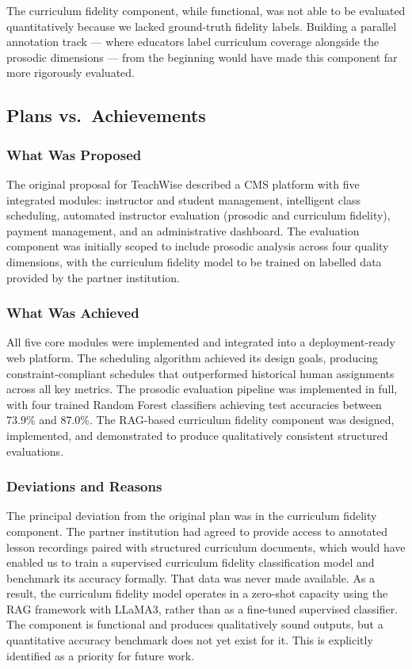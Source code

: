 The curriculum fidelity component, while functional, was not able to be evaluated quantitatively because we lacked ground-truth fidelity labels. Building a parallel annotation track --- where educators label curriculum coverage alongside the prosodic dimensions --- from the beginning would have made this component far more rigorously evaluated.

\subsection{Plans vs.\ Achievements}

\subsubsection{What Was Proposed}

The original proposal for TeachWise described a CMS platform with five integrated modules: instructor and student management, intelligent class scheduling, automated instructor evaluation (prosodic and curriculum fidelity), payment management, and an administrative dashboard. The evaluation component was initially scoped to include prosodic analysis across four quality dimensions, with the curriculum fidelity model to be trained on labelled data provided by the partner institution.

\subsubsection{What Was Achieved}

All five core modules were implemented and integrated into a deployment-ready web platform. The scheduling algorithm achieved its design goals, producing constraint-compliant schedules that outperformed historical human assignments across all key metrics. The prosodic evaluation pipeline was implemented in full, with four trained Random Forest classifiers achieving test accuracies between 73.9\% and 87.0\%. The RAG-based curriculum fidelity component was designed, implemented, and demonstrated to produce qualitatively consistent structured evaluations.

\subsubsection{Deviations and Reasons}

The principal deviation from the original plan was in the curriculum fidelity component. The partner institution had agreed to provide access to annotated lesson recordings paired with structured curriculum documents, which would have enabled us to train a supervised curriculum fidelity classification model and benchmark its accuracy formally. That data was never made available. As a result, the curriculum fidelity model operates in a zero-shot capacity using the RAG framework with LLaMA3, rather than as a fine-tuned supervised classifier. The component is functional and produces qualitatively sound outputs, but a quantitative accuracy benchmark does not yet exist for it. This is explicitly identified as a priority for future work.

